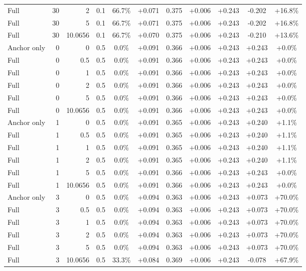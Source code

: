 \begin{table}[htbp]
\begin{tabular}{lrrrccccccc}
Full & 30 & 2 & 0.1 & 66.7\% & +0.071 & 0.375 & +0.006 & +0.243 & -0.202 & +16.8\% \\
Full & 30 & 5 & 0.1 & 66.7\% & +0.071 & 0.375 & +0.006 & +0.243 & -0.202 & +16.8\% \\
Full & 30 & 10.0656 & 0.1 & 66.7\% & +0.070 & 0.375 & +0.006 & +0.243 & -0.210 & +13.6\% \\
Anchor only & 0 & 0 & 0.5 & 0.0\% & +0.091 & 0.366 & +0.006 & +0.243 & +0.243 & +0.0\% \\
Full & 0 & 0.5 & 0.5 & 0.0\% & +0.091 & 0.366 & +0.006 & +0.243 & +0.243 & +0.0\% \\
Full & 0 & 1 & 0.5 & 0.0\% & +0.091 & 0.366 & +0.006 & +0.243 & +0.243 & +0.0\% \\
Full & 0 & 2 & 0.5 & 0.0\% & +0.091 & 0.366 & +0.006 & +0.243 & +0.243 & +0.0\% \\
Full & 0 & 5 & 0.5 & 0.0\% & +0.091 & 0.366 & +0.006 & +0.243 & +0.243 & +0.0\% \\
Full & 0 & 10.0656 & 0.5 & 0.0\% & +0.091 & 0.366 & +0.006 & +0.243 & +0.243 & +0.0\% \\
Anchor only & 1 & 0 & 0.5 & 0.0\% & +0.091 & 0.365 & +0.006 & +0.243 & +0.240 & +1.1\% \\
Full & 1 & 0.5 & 0.5 & 0.0\% & +0.091 & 0.365 & +0.006 & +0.243 & +0.240 & +1.1\% \\
Full & 1 & 1 & 0.5 & 0.0\% & +0.091 & 0.365 & +0.006 & +0.243 & +0.240 & +1.1\% \\
Full & 1 & 2 & 0.5 & 0.0\% & +0.091 & 0.365 & +0.006 & +0.243 & +0.240 & +1.1\% \\
Full & 1 & 5 & 0.5 & 0.0\% & +0.091 & 0.366 & +0.006 & +0.243 & +0.243 & +0.0\% \\
Full & 1 & 10.0656 & 0.5 & 0.0\% & +0.091 & 0.366 & +0.006 & +0.243 & +0.243 & +0.0\% \\
Anchor only & 3 & 0 & 0.5 & 0.0\% & +0.094 & 0.363 & +0.006 & +0.243 & +0.073 & +70.0\% \\
Full & 3 & 0.5 & 0.5 & 0.0\% & +0.094 & 0.363 & +0.006 & +0.243 & +0.073 & +70.0\% \\
Full & 3 & 1 & 0.5 & 0.0\% & +0.094 & 0.363 & +0.006 & +0.243 & +0.073 & +70.0\% \\
Full & 3 & 2 & 0.5 & 0.0\% & +0.094 & 0.363 & +0.006 & +0.243 & +0.073 & +70.0\% \\
Full & 3 & 5 & 0.5 & 0.0\% & +0.094 & 0.363 & +0.006 & +0.243 & +0.073 & +70.0\% \\
Full & 3 & 10.0656 & 0.5 & 33.3\% & +0.084 & 0.369 & +0.006 & +0.243 & -0.078 & +67.9\% \\

\end{tabular}
\end{table}
